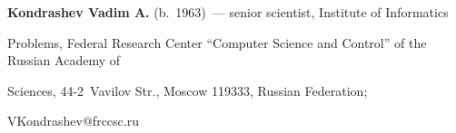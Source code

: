       \Contrl


      


      \noindent


\textbf{Kondrashev Vadim A.} (b.\ 1963)~--- senior scientist, Institute of Informatics 


Problems, Federal Research Center ``Computer Science and Control'' of the Russian Academy of 


Sciences, 44-2~Vavilov Str., Moscow 119333, Russian Federation; 


\mbox{VKondrashev@frccsc.ru}


      


\label{end\stat}








\renewcommand{\bibname}{\protect\rm Литература}


     


